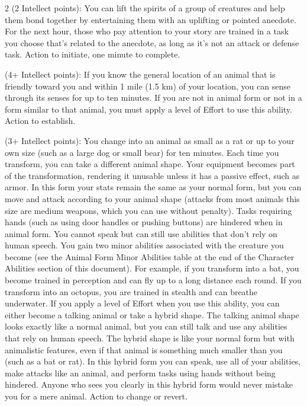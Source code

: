 \begin{multicols}{2}
 (2 Intellect points): You can lift the spirits of a group of creatures and help them bond together by entertaining them with an uplifting or pointed anecdote. For the next hour, those who pay attention to your story are trained in a task you choose that’s related to the anecdote, as long as it’s not an attack or defense task. Action to initiate, one minute to complete. 

 (4+ Intellect points): If you know the general location of an animal that is friendly toward you and within 1 mile (1.5 km) of your location, you can sense through its senses for up to ten minutes. If you are not in animal form or not in a form similar to that animal, you must apply a level of Effort to use this ability. Action to establish.

 (3+ Intellect points): You change into an animal as small as a rat or up to your own size (such as a large dog or small bear) for ten minutes. Each time you transform, you can take a different animal shape. Your equipment becomes part of the transformation, rendering it unusable unless it has a passive effect, such as armor. In this form your stats remain the same as your normal form, but you can move and attack according to your animal shape (attacks from most animals this size are medium weapons, which you can use without penalty). Tasks requiring hands (such as using door handles or pushing buttons) are hindered when in animal form. You cannot speak but can still use abilities that don’t rely on human speech. You gain two minor abilities associated with the creature you become (see the Animal Form Minor Abilities table at the end of the Character Abilities section of this document). For example, if you transform into a bat, you become trained in perception and can fly up to a long distance each round. If you transform into an octopus, you are trained in stealth and can breathe underwater. If you apply a level of Effort when you use this ability, you can either become a talking animal or take a hybrid shape. The talking animal shape looks exactly like a normal animal, but you can still talk and use any abilities that rely on human speech. The hybrid shape is like your normal form but with animalistic features, even if that animal is something much smaller than you (such as a bat or rat). In this hybrid form you can speak, use all of your abilities, make attacks like an animal, and perform tasks using hands without being hindered. Anyone who sees you clearly in this hybrid form would never mistake you for a mere animal. Action to change or revert. 


\end{multicols}
